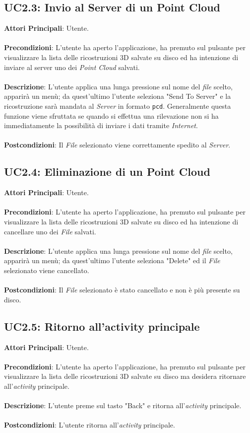 \subsection{UC2.3: Invio al Server di un Point Cloud}
\textbf{Attori Principali}: Utente.
\\\\ \textbf{Precondizioni}: L'utente ha aperto l'applicazione, ha premuto sul pulsante per visualizzare la lista delle ricostruzioni 3D salvate su disco ed ha intenzione di inviare al server uno dei \emph{Point Cloud} salvati.
\\\\ \textbf{Descrizione}: L'utente applica una lunga pressione sul nome del \emph{file} scelto, apparirà un menù; da quest'ultimo l'utente seleziona "Send To Server" e la ricostruzione sarà mandata al \emph{Server} in formato \texttt{pcd}. Generalmente questa funzione viene sfruttata se quando si effettua una rilevazione non si ha immediatamente la possibilità di inviare i dati tramite \emph{Internet}.
\\\\ \textbf{Postcondizioni}: Il \emph{File} selezionato viene correttamente spedito al \emph{Server}.

\subsection{UC2.4: Eliminazione di un Point Cloud}
\textbf{Attori Principali}: Utente.
\\\\ \textbf{Precondizioni}: L'utente ha aperto l'applicazione, ha premuto sul pulsante per visualizzare la lista delle ricostruzioni 3D salvate su disco ed ha intenzione di cancellare uno dei \emph{File} salvati.
\\\\ \textbf{Descrizione}: L'utente applica una lunga pressione sul nome del \emph{file} scelto, apparirà un menù; da quest'ultimo l'utente seleziona "Delete" ed il \emph{File} selezionato viene cancellato.
\\\\ \textbf{Postcondizioni}: Il \emph{File} selezionato è stato cancellato e non è più presente su disco.

\subsection{UC2.5: Ritorno all'activity principale}
\textbf{Attori Principali}: Utente.
\\\\ \textbf{Precondizioni}: L'utente ha aperto l'applicazione, ha premuto sul pulsante per visualizzare la lista delle ricostruzioni 3D salvate su disco ma desidera ritornare all'\emph{activity} principale.
\\\\ \textbf{Descrizione}: L'utente preme sul tasto "Back" e ritorna all'\emph{activity} principale.
\\\\ \textbf{Postcondizioni}: L'utente ritorna all'\emph{activity} principale.


